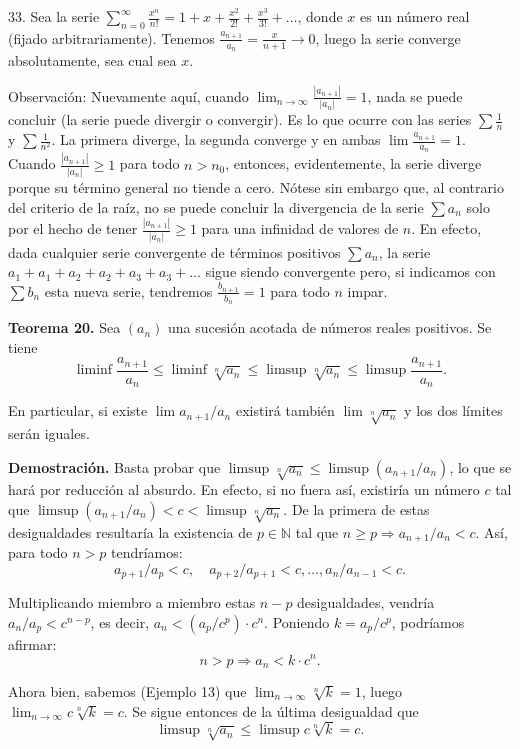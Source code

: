 \documentclass[12pt,oneside]{book}
\begin{document}
33. Sea la serie \(\sum_{n=0}^{\infty} \frac{x^n}{n!} = 1 + x + \frac{x^2}{2!} + \frac{x^3}{3!} + \dots\), donde \(x\) es un número real (fijado arbitrariamente). Tenemos \(\frac{a_{n+1}}{a_n} = \frac{x}{n+1} \to 0\), luego la serie converge absolutamente, sea cual sea \(x\).

Observación: Nuevamente aquí, cuando \(\lim_{n \to \infty} \frac{|a_{n+1}|}{|a_n|} = 1\), nada se puede concluir (la serie puede divergir o convergir). Es lo que ocurre con las series \(\sum \frac{1}{n}\) y \(\sum \frac{1}{n^2}\). La primera diverge, la segunda converge y en ambas \(\lim \frac{a_{n+1}}{a_n} = 1\). Cuando \(\frac{|a_{n+1}|}{|a_n|} \geq 1\) para todo \(n > n_0\), entonces, evidentemente, la serie diverge porque su término general no tiende a cero. Nótese sin embargo que, al contrario del criterio de la raíz, no se puede concluir la divergencia de la serie \(\sum a_n\) solo por el hecho de tener \(\frac{|a_{n+1}|}{|a_n|} \geq 1\) para una infinidad de valores de \(n\). En efecto, dada cualquier serie convergente de términos positivos \(\sum a_n\), la serie \(a_1 + a_1 + a_2 + a_2 + a_3 + a_3 + \dots\) sigue siendo convergente pero, si indicamos con \(\sum b_n\) esta nueva serie, tendremos \(\frac{b_{n+1}}{b_n} = 1\) para todo \(n\) impar.

\textbf{Teorema 20.} Sea \((a_n)\) una sucesión acotada de números reales positivos. Se tiene
\[
\liminf \frac{a_{n+1}}{a_n} \leq \liminf \sqrt[n]{a_n} \leq \limsup \sqrt[n]{a_n} \leq \limsup \frac{a_{n+1}}{a_n}.
\]

En particular, si existe \(\lim a_{n+1}/a_n\) existirá también \(\lim \sqrt[n]{a_n}\) y los dos límites serán iguales.

\textbf{Demostración.} Basta probar que \(\limsup \sqrt[n]{a_n} \leq \limsup (a_{n+1}/a_n)\), lo que se hará por reducción al absurdo. En efecto, si no fuera así, existiría un número \(c\) tal que \(\limsup(a_{n+1}/a_n) < c < \limsup\sqrt[n]{a_n}\). De la primera de estas desigualdades resultaría la existencia de \(p \in \mathbb{N}\) tal que \(n \ge p \Rightarrow a_{n+1}/a_n < c\). Así, para todo \(n > p\) tendríamos:
\[
a_{p+1}/a_p < c, \quad a_{p+2}/a_{p+1} < c, \ldots, a_n/a_{n-1} < c.
\]

Multiplicando miembro a miembro estas \(n-p\) desigualdades, vendría \(a_n/a_p < c^{n-p}\), es decir, \(a_n < (a_p/c^p) \cdot c^n\). Poniendo \(k = a_p/c^p\), podríamos afirmar:
\[
n > p \Rightarrow a_n < k \cdot c^n.
\]

Ahora bien, sabemos (Ejemplo 13) que \(\lim_{n \to \infty}\sqrt[n]{k} = 1\), luego \(\lim_{n \to \infty}c\sqrt[n]{k} = c\). Se sigue entonces de la última desigualdad que
\[
\limsup\sqrt[n]{a_n} \le \limsup c\sqrt[n]{k} = c.
\]
\end{document}
